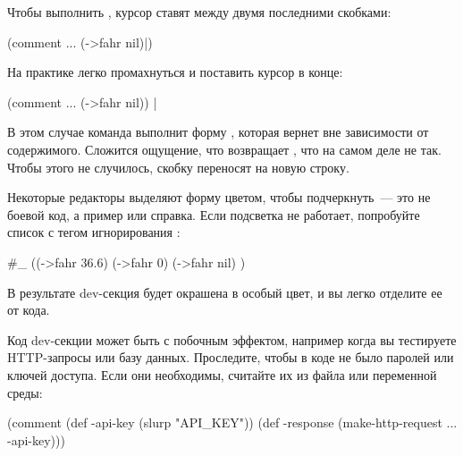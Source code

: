 Чтобы выполнить , курсор ставят между двумя последними скобками:

\begin{english}
  \begin{clojure}
(comment
  ...
  (->fahr nil)|)
  \end{clojure}
\end{english}

На практике легко промахнуться и поставить курсор в конце:

\begin{english}
  \begin{clojure}
(comment
  ...
  (->fahr nil)) |
  \end{clojure}
\end{english}

В этом случае команда  выполнит форму , которая вернет  вне зависимости от содержимого. Сложится ощущение, что  возвращает , что на самом деле не так. Чтобы этого не случилось, скобку  переносят на новую строку.

Некоторые редакторы выделяют форму  цветом, чтобы подчеркнуть~--- это не боевой код, а пример или справка. Если подсветка не работает, попробуйте список с тегом игнорирования \code{\#\_}:

\begin{english}
  \begin{clojure}
#_
((->fahr 36.6)
  (->fahr 0)
  (->fahr nil)
)
  \end{clojure}
\end{english}

В результате dev-секция будет окрашена в особый цвет, и вы легко отделите ее от кода.

Код dev-секции может быть с побочным эффектом, например когда вы тестируете HTTP-запросы или базу данных. Проследите, чтобы в коде не было паролей или ключей доступа. Если они необходимы, считайте их из файла или переменной среды:

\begin{english}
  \begin{clojure}
(comment
  (def -api-key
    (slurp "API_KEY"))
  (def -response
    (make-http-request ... -api-key)))
  \end{clojure}
\end{english}


\def\urlzipclj{https://github.com/clojure/clojure/blob/master/src/clj/clojure/zip.clj\#L281}
\def\urlzippers{https://grishaev.me/clj-zippers-1/}


